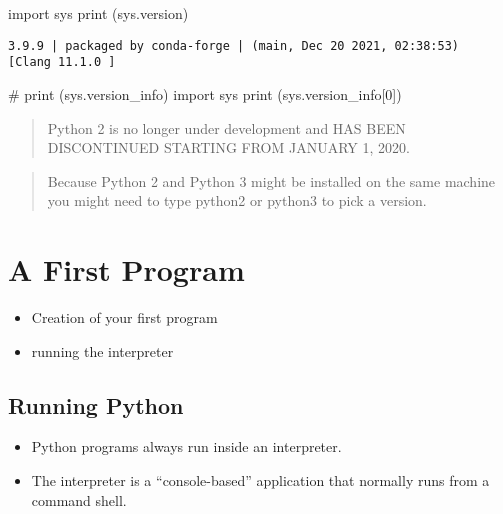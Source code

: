 \documentclass[
  letterpaper,
  DIV=11,
  numbers=noendperiod]{scrreprt}
\newenvironment{Shaded}{\begin{snugshade}}{\end{snugshade}}
\newcommand{\BuiltInTok}[1]{\textcolor[rgb]{0.00,0.46,0.62}{#1}}
\newcommand{\CommentTok}[1]{\textcolor[rgb]{0.37,0.37,0.37}{#1}}
\newcommand{\DecValTok}[1]{\textcolor[rgb]{0.68,0.00,0.00}{#1}}
\newcommand{\ImportTok}[1]{\textcolor[rgb]{0.00,0.46,0.62}{#1}}
\newcommand{\NormalTok}[1]{\textcolor[rgb]{0.00,0.46,0.62}{#1}}
\begin{document}
\begin{Shaded}
\begin{Highlighting}[]
\ImportTok{import}\NormalTok{ sys}
\BuiltInTok{print}\NormalTok{ (sys.version)}
\end{Highlighting}
\end{Shaded}

\begin{verbatim}
3.9.9 | packaged by conda-forge | (main, Dec 20 2021, 02:38:53) 
[Clang 11.1.0 ]
\end{verbatim}

\begin{Shaded}
\begin{Highlighting}[]
\CommentTok{\# print (sys.version\_info)}
\ImportTok{import}\NormalTok{ sys}
\BuiltInTok{print}\NormalTok{ (sys.version\_info[}\DecValTok{0}\NormalTok{])}
\end{Highlighting}
\end{Shaded}

\begin{quote}
Python 2 is no longer under development and HAS BEEN DISCONTINUED
STARTING FROM JANUARY 1, 2020.
\end{quote}

\begin{quote}
Because Python 2 and Python 3 might be installed on the same machine you
might need to type python2 or python3 to pick a version.
\end{quote}

\hypertarget{a-first-program}{%
\section{A First Program}\label{a-first-program}}

\begin{itemize}
\item
  Creation of your first program
\item
  running the interpreter
\end{itemize}

\hypertarget{running-python}{%
\subsection{Running Python}\label{running-python}}

\begin{itemize}
\item
  Python programs always run inside an interpreter.
\item
  The interpreter is a ``console-based'' application that normally runs
  from a command shell.
\end{itemize}
\end{document}
